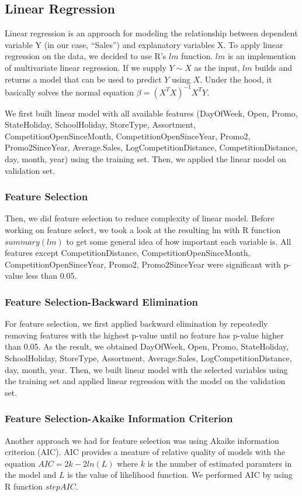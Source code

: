 \documentclass[letterpaper,twocolumn,10pt]{article}
\begin{document}
\subsection{Linear Regression}
Linear regression is an approach for modeling the relationship between dependent variable Y (in our case, ``Sales'') and explanatory variables X. To apply linear regression on the data, we decided to use R's $lm$ function. $lm$ is an implemention of multivariate linear regression. If we supply $Y \sim X$ as the input, $lm$ builds and returns a model that can be used to predict $Y$ using $X$. Under the hood, it basically solves the normal equation $\beta = (X^T X)^{-1} X^T Y$.

We first built linear model with all available features (DayOfWeek, Open, Promo, StateHoliday, SchoolHoliday, StoreType, Assortment, CompetitionOpenSinceMonth, CompetitionOpenSinceYear, Promo2, Promo2SinceYear, Average.Sales, LogCompetitionDistance, CompetitionDistance, day, month, year) using the training set. Then, we applied the linear model on validation set.

\subsubsection{Feature Selection}
Then, we did feature selection to reduce complexity of linear model. Before working on feature select, we took a look at the resulting lm with R function $summary(lm)$ to get some general idea of how important each variable is. All features except CompetitionDistance, CompetitionOpenSinceMonth, CompetitionOpenSinceYear, Promo2, Promo2SinceYear were significant with p-value less than 0.05.

\subsubsection{Feature Selection-Backward Elimination}
For feature selection, we first applied backward elimination by repeatedly removing features with the highest p-value until no feature has p-value higher than 0.05. As the result, we obtained DayOfWeek, Open, Promo, StateHoliday, SchoolHoliday, StoreType, Assortment, Average.Sales, LogCompetitionDistance, day, month, year. Then, we built linear model with the selected variables using the training set and applied linear regression with the model on the validation set.

\subsubsection{Feature Selection-Akaike Information Criterion}
Another approach we had for feature selection was using Akaike information criterion (AIC). AIC provides a meature of relative quality of models with the equation $AIC = 2k - 2 ln(L)$ where $k$ is the number of estimated paramters in the model and $L$ is the value of likelihood function. We performed AIC by using R function $stepAIC$.
\end{document}
